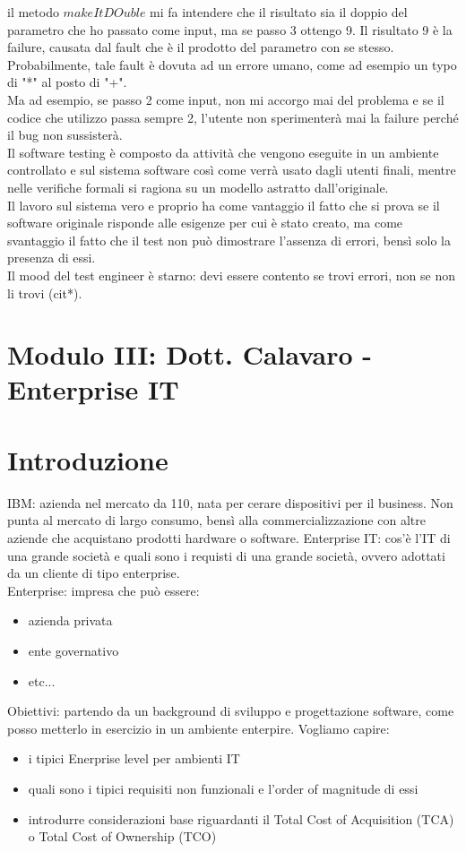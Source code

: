 \documentclass{article}
\begin{document}
il metodo $makeItDOuble$ mi fa intendere che il risultato sia il doppio del parametro che ho passato come input, ma se passo 3 ottengo 9. Il risultato 9 è la failure, causata dal fault che è il prodotto del parametro con se stesso. Probabilmente, tale fault è dovuta ad un errore umano, come ad esempio un typo di "*" al posto di "+".\\ Ma ad esempio, se passo 2 come input, non mi accorgo mai del problema e se il codice che utilizzo passa sempre 2, l'utente non sperimenterà mai la failure perché il bug non sussisterà.\\ Il software testing è composto da attività che vengono eseguite in un ambiente controllato e sul sistema software così come verrà usato dagli utenti finali, mentre nelle verifiche formali si ragiona su un modello astratto dall'originale.\\ Il lavoro sul sistema vero e proprio ha come vantaggio il fatto che si prova se il software originale risponde alle esigenze per cui è stato creato, ma come svantaggio il fatto che il test non può dimostrare l'assenza di errori, bensì solo la presenza di essi.\\ Il mood del test engineer è starno: devi essere contento se trovi errori, non se non li trovi (cit*).\\
\newpage
\section{Modulo III: Dott. Calavaro - Enterprise IT}
\section{Introduzione}
IBM: azienda nel mercato da 110, nata per cerare dispositivi per il business. Non punta al mercato di largo consumo, bensì alla commercializzazione con altre aziende che acquistano prodotti hardware o software. Enterprise IT: cos'è l'IT di una grande società e quali sono i requisti di una grande società, ovvero adottati da un cliente di tipo enterprise.\\ Enterprise: impresa che può essere:
\begin{itemize}
\item azienda privata
\item ente governativo
\item etc...
\end{itemize}
Obiettivi: partendo da un background di sviluppo e progettazione software, come posso metterlo in esercizio in un ambiente enterpire. Vogliamo capire:
\begin{itemize}
\item i tipici Enerprise level per ambienti IT
\item quali sono i tipici requisiti non funzionali e l'order of magnitude di essi
\item introdurre considerazioni base riguardanti il Total Cost of Acquisition (TCA) o Total Cost of Ownership (TCO)
\end{itemize}
\end{document}
